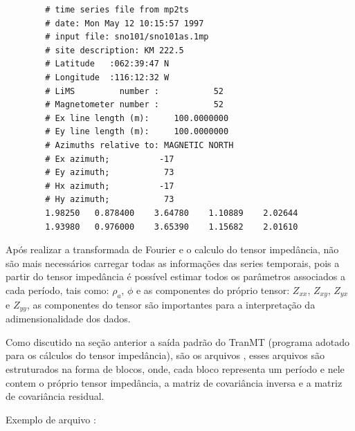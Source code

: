         \begin{footnotesize}        
\begin{verbatim}
        # time series file from mp2ts 
        # date: Mon May 12 10:15:57 1997
        # input file: sno101/sno101as.1mp
        # site description: KM 222.5
        # Latitude   :062:39:47 N
        # Longitude  :116:12:32 W
        # LiMS         number :           52
        # Magnetometer number :           52
        # Ex line length (m):     100.0000000
        # Ey line length (m):     100.0000000
        # Azimuths relative to: MAGNETIC NORTH 
        # Ex azimuth;          -17
        # Ey azimuth;           73 
        # Hx azimuth;          -17 
        # Hy azimuth;           73 
        1.98250   0.878400    3.64780    1.10889    2.02644                                  
        1.93980   0.976000    3.65390    1.15682    2.01610                                     
\end{verbatim}
\end{footnotesize}
            \begin{flushright}
                \cite{ts-format}
            \end{flushright}
        
        Após realizar a transformada de Fourier e o calculo do tensor impedância, não são mais necessários carregar todas as informações das series temporais, pois a partir do tensor impedância é possível estimar todos os parâmetros associados a cada período, tais como: $\rho_a$, $\phi$ e as componentes do próprio tensor: $Z_{xx}$, $Z_{xy}$, $Z_{yx}$ e $Z_{yy}$, as componentes do tensor são importantes para a interpretação da adimensionalidade dos dados.
        
        Como discutido na seção anterior a saída padrão do TranMT (programa adotado para os cálculos do tensor impedância), são os arquivos , esses arquivos são estruturados na forma de blocos, onde, cada bloco representa um período e nele contem o próprio tensor impedância, a matriz de covariância inversa e a matriz de covariância residual.
        
        Exemplo de arquivo :
        
